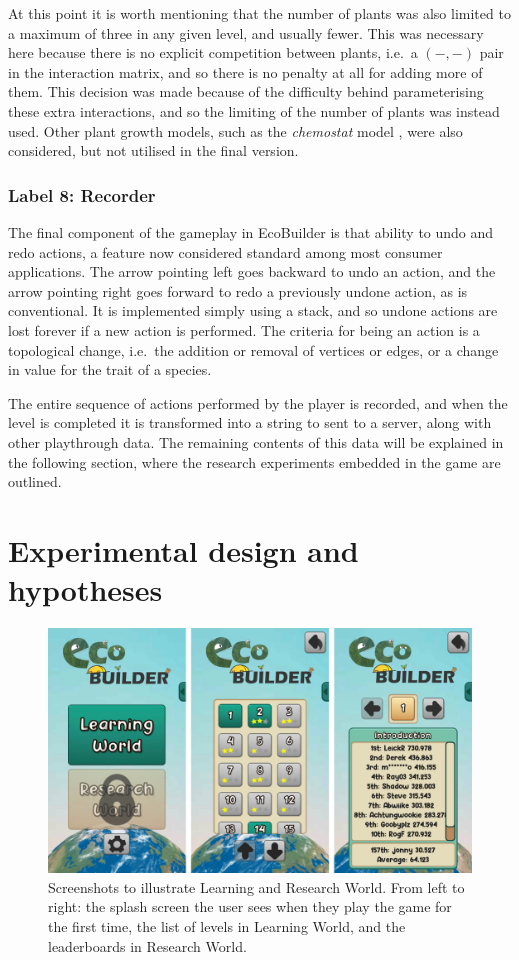 At this point it is worth mentioning that the number of plants was also limited to a maximum of three in any given level, and usually fewer. This was necessary here because there is no explicit competition between plants, i.e.\ a $(-,-)$ pair in the interaction matrix, and so there is no penalty at all for adding more of them.
This decision was made because of the difficulty behind parameterising these extra interactions, and so the limiting of the number of plants was instead used. Other plant growth models, such as the \emph{chemostat} model \cite{TODO}, were also considered, but not utilised in the final version.

\subsubsection{Label 8: Recorder}
The final component of the gameplay in EcoBuilder is that ability to undo and redo actions, a feature now considered standard among most consumer applications. The arrow pointing left goes backward to undo an action, and the arrow pointing right goes forward to redo a previously undone action, as is conventional. It is implemented simply using a stack, and so undone actions are lost forever if a new action is performed.
The criteria for being an action is a topological change, i.e.\ the addition or removal of vertices or edges, or a change in value for the trait of a species.

The entire sequence of actions performed by the player is recorded, and when the level is completed it is transformed into a string to sent to a server, along with other playthrough data. The remaining contents of this data will be explained in the following section, where the research experiments embedded in the game are outlined.


\section{Experimental design and hypotheses}
\label{sec:eco_hypotheses}
\begin{figure}
    \centering
    \includegraphics[width=\textwidth]{joy/worlds.png}
    \caption[Learning World and Research World]{Screenshots to illustrate Learning and Research World. From left to right: the splash screen the user sees when they play the game for the first time, the list of levels in Learning World, and the leaderboards in Research World.}
    \label{fig:eco_worlds}
\end{figure}

